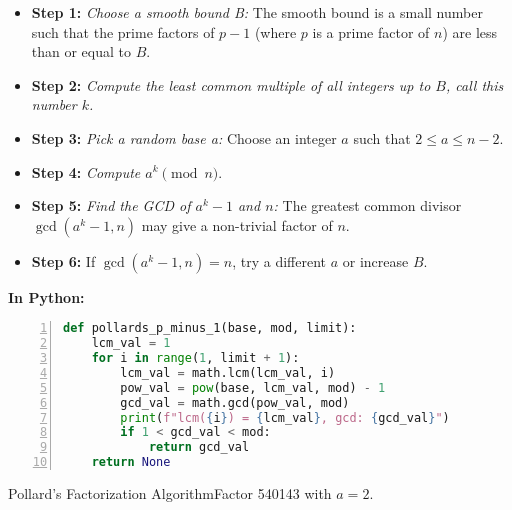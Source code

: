 \begin{itemize}
    \item \textbf{Step 1:} \textit{Choose a smooth bound B:} The smooth bound is a small number such that the prime factors of \(p - 1\) (where \(p\) is a prime factor of \(n\)) are less than or equal to \(B\).
    \item \textbf{Step 2:} \textit{Compute the least common multiple of all integers up to \(B\), call this number \(k\).}
    \item \textbf{Step 3:} \textit{Pick a random base a:} Choose an integer \(a\) such that \(2 \leq a \leq n - 2\).
    \item \textbf{Step 4:} \textit{Compute \(a^{k} \pmod{n}\)}.
    \item \textbf{Step 5:} \textit{Find the GCD of \(a^k - 1\) and \(n\):} The greatest common divisor \(\gcd(a^k - 1, n)\) may give a non-trivial factor of \(n\).
    \item \textbf{Step 6:} If \(\gcd(a^k - 1,n) = n\), try a different \(a\) or increase \(B\).
\end{itemize}

\begin{center}
    \textbf{In Python:}
\end{center}
\label{pollard's p python}
\begin{lstlisting}[language=Python, numbers=left]
def pollards_p_minus_1(base, mod, limit):
    lcm_val = 1
    for i in range(1, limit + 1):
        lcm_val = math.lcm(lcm_val, i)
        pow_val = pow(base, lcm_val, mod) - 1
        gcd_val = math.gcd(pow_val, mod)
        print(f"lcm({i}) = {lcm_val}, gcd: {gcd_val}")
        if 1 < gcd_val < mod:
            return gcd_val
    return None
\end{lstlisting}

\begin{example}
    {Pollard's Factorization Algorithm}Factor 540143 with \(a = 2\).
\end{example}


